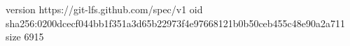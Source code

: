 version https://git-lfs.github.com/spec/v1
oid sha256:0200dcecf044bb1f351a3d65b22973f4e97668121b0b50ceb455c48e90a2a711
size 6915
